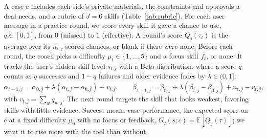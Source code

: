 \documentclass[11pt]{article}
\makeatletter
\renewcommand\paragraph{\@startsection{paragraph}{4}{\z@}{0.7ex \@plus 0.3ex}{-1em}{\normalfont\normalsize\bfseries}}
\newcommand{\E}{\mathbb{E}}
\makeatother
\begin{document}
\paragraph{Model:}
A case $c$ includes each side's private materials, the constraints and approvals a deal
needs, and a rubric of $J=6$ skills (Table~\ref{tab:rubric}). For each user message in a
practice round, we score every skill it gave a chance to use, $q\in[0,1]$, from $0$
(missed) to $1$ (effective). A round's score $Q_j(\tau_t)$ is the average over its
$n_{t,j}$ scored chances, or blank if there were none. Before each round, the coach picks
a difficulty $\mu_t\in\{1,\dots,5\}$ and a focus skill $f_t$, or none. It tracks the
user's hidden skill level $s_{t,j}$ with a Beta distribution, where a score $q$ counts as
$q$ successes and $1-q$ failures and older evidence fades by $\lambda\in(0,1]$:
\[
\alpha_{t+1,j}=\alpha_{0,j}+\lambda(\alpha_{t,j}-\alpha_{0,j})+v_{t,j},\qquad
\beta_{t+1,j}=\beta_{0,j}+\lambda(\beta_{t,j}-\beta_{0,j})+n_{t,j}-v_{t,j},
\]
with $v_{t,j}=\sum_w q_{w,j}$. The next round targets the skill that looks weakest,
favoring skills with little evidence. Success means case performance, the expected score
on $c$ at a fixed difficulty $\mu_0$ with no focus or feedback, $G_j(s;c)=\E[Q_j(\tau)]$;
we want it to rise more with the tool than without.
\end{document}
